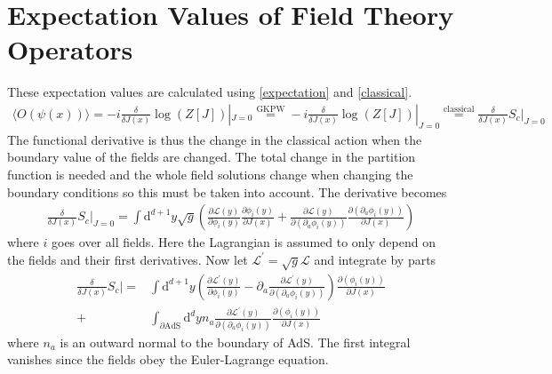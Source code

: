 \documentclass[12pt]{report}
\renewcommand{\d}{\ensuremath{\mathrm{d}}}
\renewcommand{\L}{\ensuremath{\mathcal{L}}}
\newcommand{\At}{\ensuremath{{\phi}}}
\begin{document}
\section{Expectation Values of Field Theory Operators}
These expectation values are calculated using \eqref{expectation} and \eqref{classical}.
\begin{equation}
\begin{split}
\langle O(\psi(x))\rangle=-i\frac{\delta}{\delta J(x)}\log(Z[J])|_{J=0}\stackrel{\mathrm{GKPW}}{=}-i\frac{\delta}{\delta J(x)}\log(Z[J])|_{J=0}\stackrel{\mathrm{classical}}{=}\frac{\delta}{\delta J(x)}S_c|_{J=0}
\end{split}
\end{equation}
The functional derivative is thus the change in the classical action when the boundary value of the fields are changed. The total change in the partition function is needed and the whole field solutions change when changing the boundary conditions so this must be taken into account. The derivative becomes
\begin{equation}
\begin{split}
\frac{\delta}{\delta J(x)}S_c|_{J=0}=\int \d^{d+1}y\sqrt{g}\left(\frac{\partial\L(y)}{\partial \At_i(y)}\frac{\partial \At_i(y)}{\partial J(x)}+\frac{\partial\L(y)}{\partial (\partial_a\At_i(y))}\frac{\partial (\partial_a\At_i(y))}{\partial J(x)}\right)
\end{split}
\end{equation}
where $i$ goes over all fields. Here the Lagrangian is assumed to only depend on the fields and their first derivatives. Now let $\L^\prime=\sqrt{g}\L$ and integrate by parts
\begin{equation}
\begin{split}
\frac{\delta}{\delta J(x)}S_c|=&\int \d^{d+1}y\left(\frac{\partial\L^\prime(y)}{\partial \At_i(y)}-\partial_a\frac{\partial\L^\prime(y)}{\partial (\partial_a\At_i(y))}\right)\frac{\partial (\At_i(y))}{\partial J(x)}\\
+&\int_{\partial\mathrm{AdS}} \d^{d}yn_a\frac{\partial\L^\prime(y)}{\partial (\partial_a\At_i(y))}\frac{\partial (\At_i(y))}{\partial J(x)}
\end{split}
\end{equation}
where $n_a$ is an outward normal to the boundary of AdS.
The first integral vanishes since the fields obey the Euler-Lagrange equation.
\end{document}
